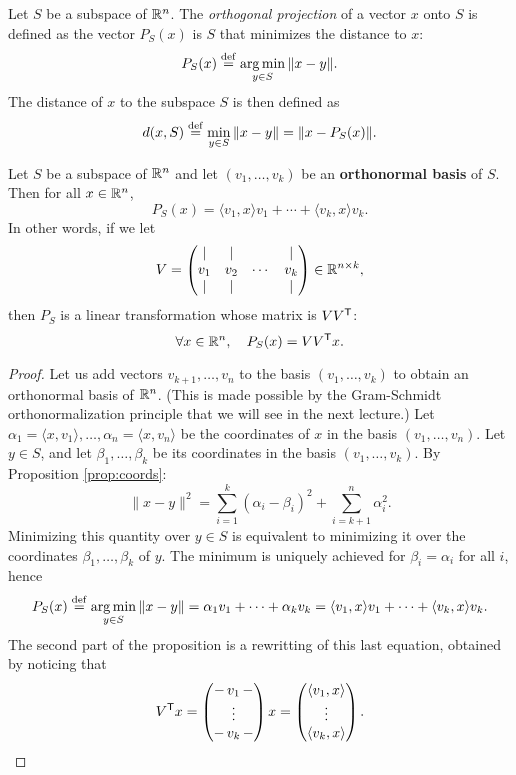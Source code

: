 \documentclass[11pt,nocut]{article}
\begin{document}
\begin{definition}
	Let $S$ be a subspace of $\mathbb{R}^n$. The \emph{orthogonal projection} of a vector $x$ onto $S$ is defined as the vector $P_S(x)$ is $S$ that minimizes the distance to $x$:
	$$
	P_S(x) \overset{\rm def}{=} \operatorname*{arg\,min}_{y \in S} \|x - y\|.
	$$
	The distance of $x$ to the subspace $S$ is then defined as
	$$
	d(x,S) \overset{\rm def}{=} \min_{y \in S} \| x - y \| = \|x - P_S(x)\|.
	$$
\end{definition}

\begin{proposition}\label{prop:ortho}
	Let $S$ be a subspace of $\mathbb{R}^n$ and let $(v_1, \dots, v_k)$ be an \textbf{orthonormal basis} of $S$. Then for all $x \in \mathbb{R}^n$,
		$$P_S(x) = \langle v_1, x \rangle v_1 + \cdots + \langle v_k, x \rangle v_k.$$
		In other words, if we let
		$$
		V = 
\begin{pmatrix}
	| & | & & | \\
	v_1 & v_2 & \cdots& v_k \\
	| & | & & |
\end{pmatrix}
\in \mathbb{R}^{n \times k},
		$$
		then $P_S$ is a linear transformation whose matrix is $VV^{{\sf T}}$:
		$$
		\forall x \in \mathbb{R}^n, \quad P_S(x) = V V^{{\sf T}} x.
		$$
\end{proposition}
\begin{proof}
	Let us add vectors $v_{k+1}, \dots, v_n$ to the basis $(v_1, \dots, v_k)$ to obtain an orthonormal basis of $\mathbb{R}^n$. (This is made possible by the Gram-Schmidt orthonormalization principle that we will see in the next lecture.)
	Let $\alpha_1 = \langle x, v_1 \rangle, \dots, \alpha_n = \langle x , v_n \rangle$ be the coordinates of $x$ in the basis $(v_1, \dots, v_n)$.
	Let $y \in S$, and let $\beta_1, \dots, \beta_k$ be its coordinates in the basis $(v_1, \dots, v_k)$. By Proposition \ref{prop:coords}:
	$$
	\|x-y\|^2 = \sum_{i=1}^k (\alpha_i - \beta_i)^2 + \sum_{i=k+1}^n \alpha_i^2.
	$$
	Minimizing this quantity over $y \in S$ is equivalent to minimizing it over the coordinates $\beta_1, \dots, \beta_k$ of $y$. The minimum is uniquely achieved for $\beta_i = \alpha_i$ for all $i$, hence
	$$
	P_S(x) \overset{\rm def}{=} \operatorname*{arg\,min}_{y \in S} \|x - y\|
	= \alpha_1 v_1 + \dots + \alpha_k v_k
	= \langle v_1, x \rangle v_1 + \dots + \langle v_k, x \rangle v_k.
	$$
	The second part of the proposition is a rewritting of this last equation, obtained by noticing that
	$$
	V^{{\sf T}} x 
	= 
\begin{pmatrix}
	- \, v_1 \, -\\
	\vdots\\
	- \, v_k \,-
\end{pmatrix}
x
=
\begin{pmatrix}
	\langle v_1, x \rangle \\
	\vdots \\
	\langle v_k, x \rangle
\end{pmatrix}.
	$$
\end{proof}
\end{document}
